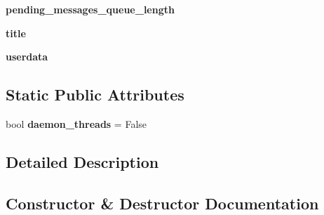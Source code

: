 \begin{DoxyCompactItemize}
\item 
{\bfseries pending\+\_\+messages\+\_\+queue\+\_\+length}\hypertarget{classremi_1_1server_1_1ThreadedHTTPServer_a054aee19e7809c439b7486e14de338ee}{}\label{classremi_1_1server_1_1ThreadedHTTPServer_a054aee19e7809c439b7486e14de338ee}

\item 
{\bfseries title}\hypertarget{classremi_1_1server_1_1ThreadedHTTPServer_a692bc9ead73bc0d8d700e1fca7690524}{}\label{classremi_1_1server_1_1ThreadedHTTPServer_a692bc9ead73bc0d8d700e1fca7690524}

\item 
{\bfseries userdata}\hypertarget{classremi_1_1server_1_1ThreadedHTTPServer_aef005c898841b5ccedf3d0afe2c1758d}{}\label{classremi_1_1server_1_1ThreadedHTTPServer_aef005c898841b5ccedf3d0afe2c1758d}

\end{DoxyCompactItemize}
\subsection*{Static Public Attributes}
\begin{DoxyCompactItemize}
\item 
bool {\bfseries daemon\+\_\+threads} = False\hypertarget{classremi_1_1server_1_1ThreadedHTTPServer_a93f8148909c73fba5dcbfa5da69c25ca}{}\label{classremi_1_1server_1_1ThreadedHTTPServer_a93f8148909c73fba5dcbfa5da69c25ca}

\end{DoxyCompactItemize}


\subsection{Detailed Description}
\begin{DoxyVerb}\end{DoxyVerb}
 

\subsection{Constructor \& Destructor Documentation}
